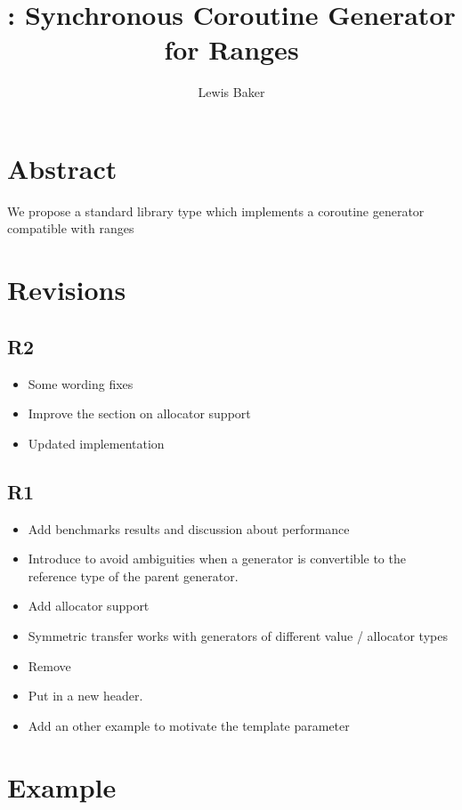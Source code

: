\documentclass{wg21}
\title{\tcode{std::generator}: Synchronous Coroutine Generator for Ranges}
\author{Lewis Baker}{lewissbaker@gmail.com}
\begin{document}
\maketitle


\section{Abstract}

We propose a standard library type  which implements a coroutine generator compatible with ranges


\section{Revisions}

\subsection{R2}
\begin{itemize}
\item Some wording fixes
\item Improve the section on allocator support
\item Updated implementation
\end{itemize}

\subsection{R1}
\begin{itemize}
\item Add benchmarks results and discussion about performance
\item Introduce  to avoid ambiguities when a generator is convertible to the reference type of the parent generator.
\item Add allocator support
\item Symmetric transfer works with generators of different value / allocator types
\item Remove 
\item Put  in a new  header.
\item Add an other example to motivate the  template parameter
\end{itemize}


\section{Example}
\end{document}
